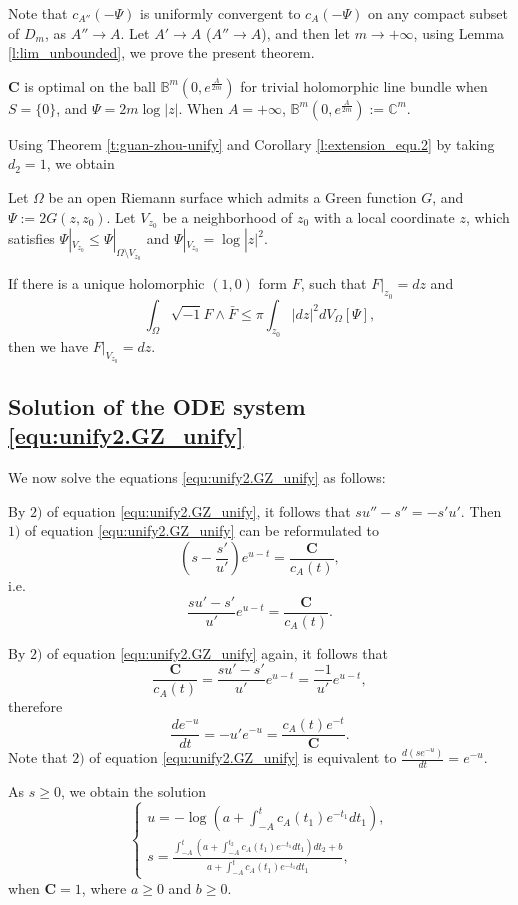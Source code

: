 Note that $c_{A''}(-\Psi)$ is uniformly convergent to $c_{A}(-\Psi)$
on any compact subset of $D_{m}$, as $A''\to A$. Let $A'\to A$
($A''\to A$), and then let $m\to+\infty$, using Lemma
\ref{l:lim_unbounded}, we prove the present theorem.

\begin{Remark}\label{r:guan-zhou-unify-exa1}
$\mathbf{C}$ is optimal on the ball $\mathbb{B}^{m}(0,e^{\frac{A}{2m}})$ for trivial
holomorphic line bundle when $S=\{0\}$, and $\Psi=2m\log|z|$.
When $A=+\infty$, $\mathbb{B}^{m}(0,e^{\frac{A}{2m}}):=\mathbb{C}^{m}$.
\end{Remark}

Using Theorem \ref{t:guan-zhou-unify} and Corollary
\ref{l:extension_equ.2} by taking $d_{2}=1$, we obtain

\begin{cor}
\label{c:unify.1} Let $\Omega$ be an open Riemann surface which
admits a Green function $G$, and $\Psi:=2G(z,z_{0})$. Let $V_{z_0}$
be a neighborhood of $z_0$ with a local coordinate $z$, which
satisfies $\Psi|_{V_{z_0}}\leq\Psi|_{\Omega\setminus V_{z_0}}$ and
$\Psi|_{V_{z_0}}=\log|z|^{2}$.

If there is a unique holomorphic $(1,0)$ form $F$, such that
$F|_{z_0}=dz$ and
$$\int_{\Omega}\sqrt{-1}F\wedge\bar{F}\leq\pi\int_{z_{0}}|dz|^{2}dV_{\Omega}[\Psi],$$
then we have
$F|_{V_{z_0}}=dz$.
\end{cor}

\subsection{Solution of the ODE system \ref{equ:unify2.GZ_unify}}
\label{subsec:ODE}

We now solve the equations \ref{equ:unify2.GZ_unify} as follows:

By $2)$ of equation \ref{equ:unify2.GZ_unify}, it follows that
$su''-s''=-s'u'$. Then $1)$ of equation \ref{equ:unify2.GZ_unify}
can be reformulated to
$$(s-\frac{s'}{u'})e^{u-t}=\frac{\mathbf{C}}{c_{A}(t)},$$
i.e.
$$\frac{su'-s'}{u'}e^{u-t}=\frac{\mathbf{C}}{c_{A}(t)}.$$

By $2)$ of equation \ref{equ:unify2.GZ_unify} again, it follows that
$$\frac{\mathbf{C}}{c_{A}(t)}=\frac{su'-s'}{u'}e^{u-t}=\frac{-1}{u'}e^{u-t},$$
therefore
$$\frac{de^{-u}}{dt}=-u'e^{-u}=\frac{c_{A}(t)e^{-t}}{\mathbf{C}}.$$
Note that $2)$ of equation \ref{equ:unify2.GZ_unify} is equivalent to
$\frac{d(se^{-u})}{dt}=e^{-u}$.

As $s\geq 0$, we obtain the solution
\begin{displaymath}
     \begin{cases}
      u=-\log(a+\int_{-A}^{t}c_{A}(t_{1})e^{-t_{1}}dt_{1}), \\
      s=\frac{\int_{-A}^{t}(a+\int_{-A}^{t_{2}}c_{A}(t_{1})e^{-t_{1}}dt_{1})dt_{2}+b}
      {a+\int_{-A}^{t}c_{A}(t_{1})e^{-t_{1}}dt_{1}},
      \end{cases}
\end{displaymath}
when $\mathbf{C}=1$, where $a\geq 0$ and $b\geq0$.

